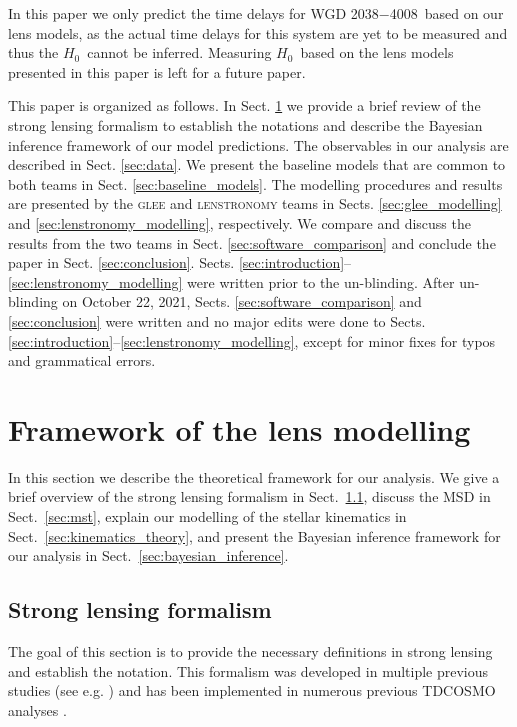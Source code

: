 \documentclass[longauth]{aa}
\newcommand{\ho}{$H_0$}
\newcommand{\lensname}{WGD 2038$-$4008}
\newcommand{\ajs}[1]{{{#1}}}
\newcommand{\ajsiv}[1]{{{#1}}}
\newcommand{\lreply}[1]{{{#1}}}
\begin{document}
\ajs{In this paper we only predict the time delays for \lensname\ based on our lens models, as the actual time delays for this system are yet to be measured and thus the \ho\ cannot be inferred. Measuring \ho\ based on the lens models presented in this paper is left for a future paper.}

This paper is organized as follows. In Sect. \ref{sec:theory_framework} we provide a brief review of the strong lensing formalism to establish the notations and describe the Bayesian inference framework of our model predictions. The observables in our analysis are described in Sect. \ref{sec:data}. We present the baseline models that are common to both teams in Sect. \ref{sec:baseline_models}. The modelling procedures and results are presented by the \textsc{glee} and \textsc{lenstronomy} teams in Sects. \ref{sec:glee_modelling} and \ref{sec:lenstronomy_modelling}, respectively. We compare and discuss the results from the two teams  in Sect. \ref{sec:software_comparison} and conclude the paper in Sect. \ref{sec:conclusion}. \lreply{Sects.} \ref{sec:introduction}--\ref{sec:lenstronomy_modelling} \ajsiv{were} written prior to the un-blinding. After un-blinding on October 22, 2021, Sects. \ref{sec:software_comparison} and \ref{sec:conclusion} \ajsiv{were} written and no major edits \ajsiv{were} done to Sects. \ref{sec:introduction}--\ref{sec:lenstronomy_modelling}, except for minor fixes for typos and grammatical errors.


\section{Framework of the lens modelling} \label{sec:theory_framework}

In this section we describe the theoretical framework for our analysis. We give a brief overview of the strong lensing formalism in Sect.~\ref{sec:lensing_formalism}, discuss the MSD in Sect.~\ref{sec:mst}, explain our modelling of the stellar kinematics in Sect.~\ref{sec:kinematics_theory}, and present the Bayesian inference framework for our analysis in Sect.~\ref{sec:bayesian_inference}.


\subsection{Strong lensing formalism} \label{sec:lensing_formalism}

The goal of this section is to provide the necessary definitions in strong lensing and establish the notation. This formalism was developed in multiple previous studies (see e.g. \citealt{Schneider92, Blandford92}) and has been implemented in numerous previous TDCOSMO analyses \citep[e.g.][]{Suyu10, Birrer19b, Shajib20}.
\end{document}
